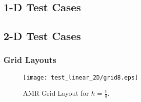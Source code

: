 \newpage
\subsection{1-D Test Cases}
\label{Results1D}

\newpage


\newpage


\newpage


\newpage


\newpage


\newpage


\newpage


\newpage


\newpage


\newpage
\subsection{2-D Test Cases}
\label{Results2D}

\subsubsection{Grid Layouts}
\begin{figure}[htbp]
\begin{center}
\texttt{[image: test\_linear\_2D/grid8.eps]}
\end{center}
\caption{AMR Grid Layout for $h = \frac18$.} \label{grid8_2D}
\end{figure}

\newpage


\newpage


\newpage


\newpage


\newpage


\newpage


\newpage


\newpage


\newpage


\newpage


